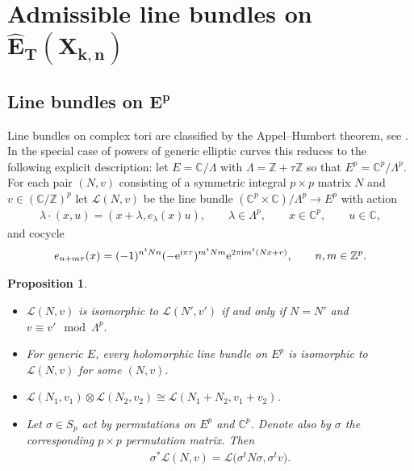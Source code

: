 \documentclass[pdftex]{sigma}
\numberwithin{equation}{section}
\newtheorem{Proposition}[Theorem]{Proposition}
 { \theoremstyle{definition}
\newtheorem{Definition}[Theorem]{Definition}
\newtheorem{Example}[Theorem]{Example}
\newtheorem{Remark}[Theorem]{Remark} }
\begin{document}
\section[Admissible line bundles on $\hat E_T(X_{k,n})$]{Admissible line bundles on $\boldsymbol{\hat E_T(X_{k,n})}$}\label{s-5}
\subsection[Line bundles on $E^{p}$]{Line bundles on $\boldsymbol{E^{p}}$}\label{ss-alb1}
Line bundles on complex tori are classified by the Appel--Humbert theorem, see \cite[Section~I.2]{Mumford}. In the special case of powers of generic elliptic curves this reduces to the following explicit description: let $E=\mathbb C/\Lambda$ with $\Lambda=\mathbb Z+\tau\mathbb Z$ so that $E^p=\mathbb C^p/\Lambda^p$. For each pair $(N,v)$ consisting of a symmetric integral $p\times p$ matrix $N$ and $v\in(\mathbb C/\mathbb Z)^p$ let $ \mathcal L(N,v)$ be the line bundle \mbox{$(\mathbb C^p\times \mathbb C)/\Lambda^p\to E^p$} with action
\begin{gather*}
 \lambda\cdot(x,u)=(x+\lambda,e_\lambda(x)u),\qquad \lambda\in\Lambda^p, \qquad x\in \mathbb C^p,\qquad u\in \mathbb C,
\end{gather*}
and cocycle
\begin{gather*}
 e_{n+m\tau}(x)=(-1)^{n^tNn}(-{\rm e}^{{\rm i}\pi\tau})^{m^tNm}{\rm e}^{2\pi{\rm i} m^t(Nx+v)}, \qquad n,m\in\mathbb Z^p.
\end{gather*}
\begin{Proposition} \label{p-linebundles} \quad
 \begin{itemize}\itemsep=0pt
 \item[$(i)$] $\mathcal L(N,v)$ is isomorphic to $\mathcal L(N',v')$ if and only if $N=N'$ and $v\equiv v'\mod\Lambda^p$.
 \item[$(ii)$] For generic $E$, every holomorphic line bundle on $E^p$ is isomorphic to $\mathcal L(N,v)$ for some $(N,v)$.
 \item[$(iii)$] $\mathcal L(N_1,v_1)\otimes \mathcal L(N_2,v_2)\cong \mathcal L(N_1+N_2,v_1+v_2)$.
 \item[$(iv)$] Let $\sigma\in S_p$ act by permutations on $E^p$ and $\mathbb C^p$. Denote also by $\sigma$ the corresponding $p\times p$ permutation matrix. Then
 \begin{gather*}\sigma^*\mathcal L(N,v)=\mathcal L\big(\sigma^t N\sigma,\sigma^t v\big).\end{gather*}
 \end{itemize}
\end{Proposition}
\end{document}
